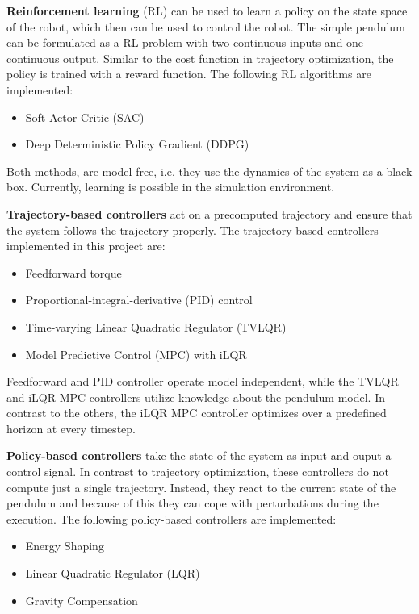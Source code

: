 \documentclass[onecolumn, letter paper]{report}
\begin{document}
\textbf{Reinforcement learning} (RL) can be used to learn a policy on the state space of the robot, which then can be used to control the robot. The simple pendulum can be formulated as a RL problem with two continuous inputs and one continuous output. Similar to the cost function in trajectory optimization, the policy is trained with a reward function. The following RL algorithms are implemented:

\begin{itemize}
    \item Soft Actor Critic (SAC) \autocite{haarnoja2018soft}
    \item Deep Deterministic Policy Gradient (DDPG) \autocite{lillicrap2019continuous}
\end{itemize}

Both methods, are model-free, i.e. they use the dynamics of the system as a black box. Currently, learning is possible in the simulation environment.

\textbf{Trajectory-based controllers} act on a precomputed trajectory and ensure that the system follows the trajectory properly. The trajectory-based controllers implemented in this project are:

\begin{itemize}
    \item Feedforward torque
    \item Proportional-integral-derivative (PID) control
    \item Time-varying Linear Quadratic Regulator (TVLQR)
    \item Model Predictive Control (MPC) with iLQR
\end{itemize}

Feedforward and PID controller operate model independent, while the TVLQR and iLQR MPC controllers utilize knowledge about the pendulum model. In contrast to the others, the iLQR MPC controller optimizes over a predefined horizon at every timestep.

\textbf{Policy-based controllers} take the state of the system as input and ouput a control signal. In contrast to trajectory optimization, these controllers do not compute just a single trajectory. Instead, they react to the current state of the pendulum and because of this they can cope with perturbations during the execution. The following policy-based controllers are implemented:

\begin{itemize}
    \item Energy Shaping
    \item Linear Quadratic Regulator (LQR)
    \item Gravity Compensation
\end{itemize}
\end{document}
